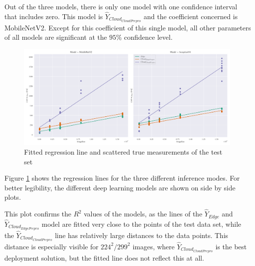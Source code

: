 Out of the three models, there is only one model with one confidence interval that includes zero.
This model is $\hat{Y}_{Cloud_{CloudPrepro}}$ and the coefficient concerned is MobileNetV2.
Except for this coefficient of this single model, all other parameters of all models are significant at the $95\%$ confidence level.




\begin{figure}[!htb]
\centering
\includegraphics[width=0.99\textwidth]{./Bilder/regression.pdf}
\caption{Fitted regression line and scattered true measurements of the test set}
\label{fig:regression}
\end{figure}

Figure \ref{fig:regression} shows the regression lines for the three different inference modes.
For better legibility, the different deep learning models are shown on side by side plots.

This plot confirms the $R^2$ values of the models, as the lines of the $\hat{Y}_{Edge}$ and $\hat{Y}_{Cloud_{EdgePrepro}}$ model are fitted very close to the points of the test data set, while the $\hat{Y}_{Cloud_{CloudPrepro}}$ line has relatively large distances to the data points.
This distance is especially visible for $224^2/299^2$ images, where $\hat{Y}_{Cloud_{CloudPrepro}}$ is the best deployment solution, but the fitted line does not reflect this at all.


